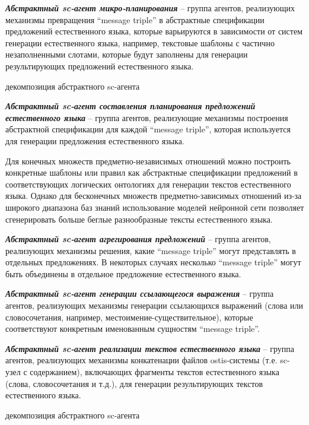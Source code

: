 \textit{\textbf{Абстрактный sc-агент микро-планирования}} -- группа агентов, реализующих механизмы превращения ``message triple'' в абстрактные спецификации предложений естественного языка, которые варьируются в зависимости от систем генерации естественного языка, например, текстовые шаблоны с частично незаполненными слотами, которые будут заполнены для генерации результирующих предложений естественного языка.
\begin{SCn}
	\begin{scnrelfromset}{декомпозиция абстрактного sc-агента}
	\end{scnrelfromset}
\end{SCn}

\textit{\textbf{Абстрактный sc-агент составления планирования предложений естественного языка}} -- группа агентов, реализующие механизмы построения абстрактной спецификации для каждой ``message triple'', которая используется для генерации предложения естественного языка.

Для конечных множеств предметно-независимых отношений можно построить конкретные шаблоны или правил как абстрактные спецификации предложений в соответствующих логических онтологиях для генерации текстов естественного языка. Однако для бесконечных множеств предметно-зависимых отношений из-за широкого диапазона баз знаний использование моделей нейронной сети позволяет сгенерировать больше беглые разнообразные тексты естественного языка. 

\textit{\textbf{Абстрактный sc-агент агрегирования предложений}} -- группа агентов, реализующих механизмы решения, какие ``message triple'' могут представлять в отдельных предложениях. В некоторых случаях несколько ``message triple'' могут быть объединены в отдельное предложение естественного языка.

\textit{\textbf{Абстрактный sc-агент генерации ссылающегося выражения}} -- группа агентов, реализующих механизмы генерации ссылающихся выражений (слова или словосочетания, например, местоимение-существительное), которые соответствуют конкретным именованным сущностям ``message triple''.

\textit{\textbf{Абстрактный sc-агент реализации текстов естественного языка}} -- группа агентов, реализующих механизмы конкатенации файлов ostis-системы (т.е. sc-узел с содержанием), включающих фрагменты текстов естественного языка (слова, словосочетания и т.д.), для генерации результирующих текстов естественного языка.
\begin{SCn}
	\begin{scnrelfromset}{декомпозиция абстрактного sc-агента}
	\end{scnrelfromset}
\end{SCn}

